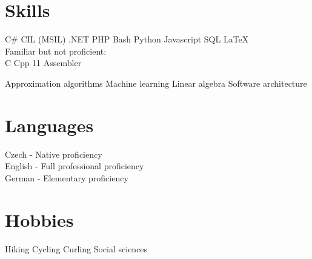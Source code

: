 \documentclass[a4paper]{deedy-resume} %
\begin{document}
\begin{minipage}[t]{0.33\textwidth}

\section{Skills}


C\# \textbullet{} CIL (MSIL) \textbullet{} .NET \textbullet{} PHP \textbullet{} Bash \textbullet{} Python \textbullet{}
Javascript \textbullet{} SQL \textbullet{} \LaTeX\ \\ 
\halfsectionspace %
Familiar but not proficient: \\
C \textbullet{} Cpp 11 \textbullet{} Assembler

\sectionspace %


Approximation algorithms \textbullet{} Machine learning \textbullet{} Linear algebra \textbullet{} Software architecture

\sectionspace %

\section{Languages}

Czech - Native proficiency \\
English - Full professional proficiency \\
German - Elementary proficiency

\sectionspace %

\section{Hobbies}

Hiking \textbullet{} Cycling \textbullet{} Curling \textbullet{} Social sciences

\sectionspace %


\end{minipage} %
\hfill
%
\end{document}
